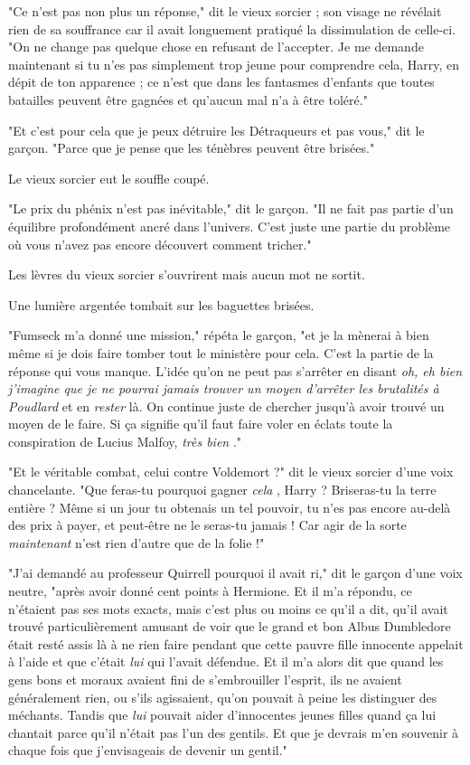 "Ce n'est pas non plus un réponse," dit le vieux sorcier ; son visage ne révélait rien de sa souffrance car il avait longuement pratiqué la dissimulation de celle-ci. "On ne change pas quelque chose en refusant de l'accepter. Je me demande maintenant si tu n'es pas simplement trop jeune pour comprendre cela, Harry, en dépit de ton apparence ; ce n'est que dans les fantasmes d'enfants que toutes batailles peuvent être gagnées et qu'aucun mal n'a à être toléré."

"Et c'est pour cela que je peux détruire les Détraqueurs et pas vous," dit le garçon. "Parce que je pense que les ténèbres peuvent être brisées."

Le vieux sorcier eut le souffle coupé.

"Le prix du phénix n'est pas inévitable," dit le garçon. "Il ne fait pas partie d'un équilibre profondément ancré dans l'univers. C'est juste une partie du problème où vous n'avez pas encore découvert comment tricher."

Les lèvres du vieux sorcier s'ouvrirent mais aucun mot ne sortit.

Une lumière argentée tombait sur les baguettes brisées.

"Fumseck m'a donné une mission," répéta le garçon, "et je la mènerai à bien même si je dois faire tomber tout le ministère pour cela. C'est la partie de la réponse qui vous manque. L'idée qu'on ne peut pas s'arrêter en disant \emph{oh, eh bien j'imagine que je ne pourrai jamais trouver un moyen d'arrêter les brutalités à Poudlard}  et en \emph{rester}  là. On continue juste de chercher jusqu'à avoir trouvé un moyen de le faire. Si ça signifie qu'il faut faire voler en éclats toute la conspiration de Lucius Malfoy, \emph{très bien} ."

"Et le véritable combat, celui contre Voldemort ?" dit le vieux sorcier d'une voix chancelante. "Que feras-tu pourquoi gagner \emph{cela} , Harry ? Briseras-tu la terre entière ? Même si un jour tu obtenais un tel pouvoir, tu n'es pas encore au-delà des prix à payer, et peut-être ne le seras-tu jamais ! Car agir de la sorte \emph{maintenant}  n'est rien d'autre que de la folie !"

"J'ai demandé au professeur Quirrell pourquoi il avait ri," dit le garçon d'une voix neutre, "après avoir donné cent points à Hermione. Et il m'a répondu, ce n'étaient pas ses mots exacts, mais c'est plus ou moins ce qu'il a dit, qu'il avait trouvé particulièrement amusant de voir que le grand et bon Albus Dumbledore était resté assis là à ne rien faire pendant que cette pauvre fille innocente appelait à l'aide et que c'était \emph{lui}  qui l'avait défendue. Et il m'a alors dit que quand les gens bons et moraux avaient fini de s'embrouiller l'esprit, ils ne avaient généralement rien, ou s'ils agissaient, qu'on pouvait à peine les distinguer des méchants. Tandis que \emph{lui}  pouvait aider d'innocentes jeunes filles quand ça lui chantait parce qu'il n'était pas l'un des gentils. Et que je devrais m'en souvenir à chaque fois que j'envisageais de devenir un gentil."

